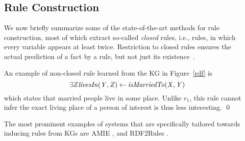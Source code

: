 \subsection{Rule Construction}

We now briefly summarize some of the state-of-the-art methods %
for rule construction, most of which %
extract so-called \emph{closed} rules,
i.e., rules, in which every variable appears at least twice. Restriction to closed rules %
ensures the actual prediction  of a fact by a rule, but not just its existence~\cite{amie}.

\begin{example}
An example of non-closed rule learned from the KG in Figure~\ref{rdf} is %
\[\exists Z \mathit{livesIn(Y,Z)} \leftarrow \mathit{isMarriedTo(X,Y)} \]  which states that married people 
live in some place. Unlike $r_1$, this rule cannot infer the exact living place of a person of interest is thus less interesting. \qed%
\end{example}

The most prominent examples of systems that are specifically tailored towards inducing rules from KGs are AMIE \cite{amie}, %
and RDF2Rules \cite{rdf2rules}.
